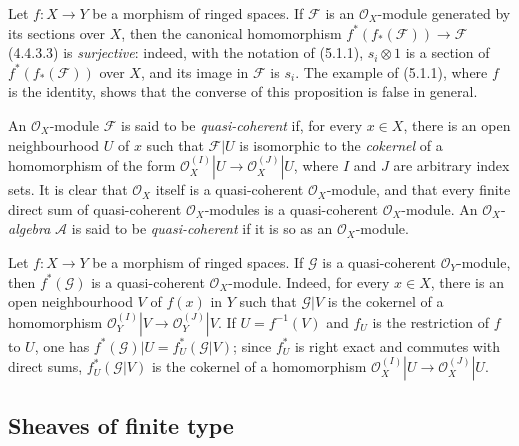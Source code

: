\begin{env}[5.1.2]
\label{0.5.1.2}
Let $f:X\to Y$ be a morphism of ringed spaces. If $\mathcal{F}$ is an
$\mathcal{O}_X$-module generated by its sections over $X$, then
the canonical homomorphism
$f^*(f_*(\mathcal{F}))\to\mathcal{F}$ (4.4.3.3) is \emph{surjective}:
indeed, with the notation of (5.1.1), $s_i\otimes1$ is a section of
$f^*(f_*(\mathcal{F}))$ over $X$, and its image in $\mathcal{F}$ is
$s_i$. The example of (5.1.1), where $f$ is the identity, shows that the converse of
this proposition is false in general.
\end{env}

\begin{env}[5.1.3]
\label{0.5.1.3}
An $\mathcal{O}_X$-module $\mathcal{F}$ is said to be \emph{quasi-coherent}
if, for every $x\in X$, there is an open neighbourhood $U$ of $x$ such that
$\mathcal{F}|U$ is isomorphic to the \emph{cokernel} of a homomorphism of the
form
$\mathcal{O}_X^{(I)}|U\to\mathcal{O}_X^{(J)}|U$, where $I$ and $J$ are
arbitrary index sets. It is clear that $\mathcal{O}_X$ itself is
a quasi-coherent $\mathcal{O}_X$-module, and that every finite direct sum of
quasi-coherent $\mathcal{O}_X$-modules is a quasi-coherent
$\mathcal{O}_X$-module. An $\mathcal{O}_X$-\emph{algebra} $\mathcal{A}$ is said to be
\emph{quasi-coherent} if it is so as an $\mathcal{O}_X$-module.
\end{env}

\begin{env}[5.1.4]
\label{0.5.1.4}
Let $f:X\to Y$ be a morphism of ringed spaces. If $\mathcal{G}$ is a
quasi-coherent $\mathcal{O}_Y$-module, then $f^*(\mathcal{G})$ is a
quasi-coherent $\mathcal{O}_X$-module. Indeed, for every $x\in X$, there is
an open neighbourhood $V$ of $f(x)$ in $Y$ such that $\mathcal{G}|V$ is the
cokernel of a homomorphism
$\mathcal{O}_Y^{(I)}|V\to\mathcal{O}_Y^{(J)}|V$. If $U=f^{-1}(V)$ and
$f_U$ is the restriction of $f$ to $U$, one has
$f^*(\mathcal{G})|U=f_U^*(\mathcal{G}|V)$; since $f_U^*$ is right exact
and commutes with direct sums, $f_U^*(\mathcal{G}|V)$ is the cokernel of a
homomorphism
$\mathcal{O}_X^{(I)}|U\to\mathcal{O}_X^{(J)}|U$.
\end{env}

\subsection{Sheaves of finite type}
\label{subsection:0.5.2}

